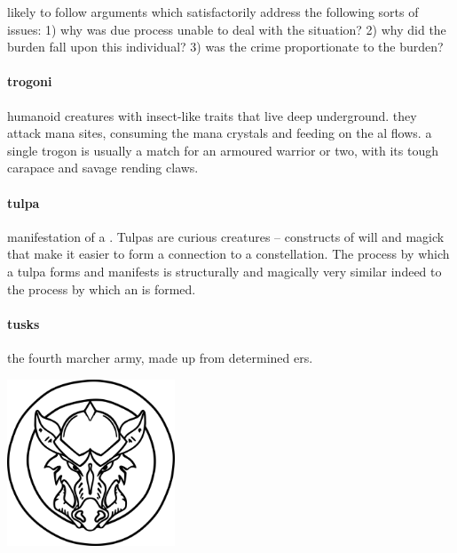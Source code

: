 likely to follow arguments which satisfactorily address the following sorts of issues: 1) why was due process unable to deal with the situation? 2) why did the burden fall upon this individual? 3) was the crime proportionate to the burden? 
\bigparagraphendtwiddle
\paragraph{trogoni} humanoid creatures with insect-like traits that live deep underground. they attack mana sites, consuming the mana crystals and feeding on the al flows. a single trogon is usually a match for an armoured warrior or two, with its tough carapace and savage rending claws.
\paragraph{tulpa} manifestation of a . Tulpas are curious creatures – constructs of will and magick that make it easier to form a connection to a constellation. The process by which a tulpa forms and manifests is structurally and magically very similar indeed to the process by which an  is formed.
\paragraph{tusks} the fourth marcher army, made up from determined ers.  \begin{center}\includegraphics[width=5cm]{encyclopedia/Tusks}\end{center}
